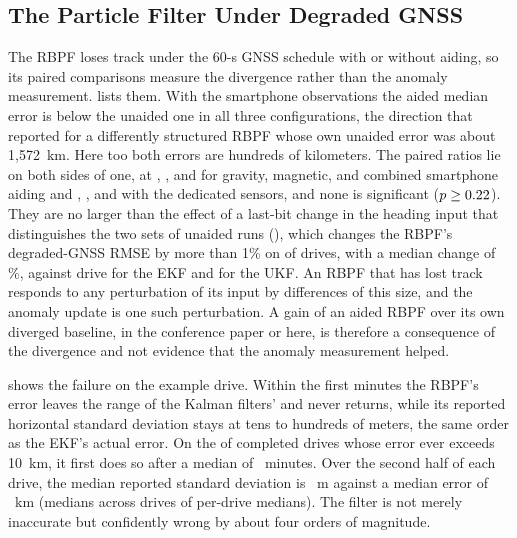 \subsection{The Particle Filter Under Degraded GNSS}
\label{sec:results-rbpf}

The RBPF loses track under the 60-s GNSS schedule with or without aiding, so its paired comparisons measure the divergence rather than the anomaly measurement.  lists them. With the smartphone observations the aided median error is below the unaided one in all three configurations, the direction that \citet{anom-pf} reported for a differently structured RBPF whose own unaided error was about 1{,}572~km. Here too both errors are hundreds of kilometers. The paired ratios lie on both sides of one, at \numphonerbpfgravratio, \numphonerbpfmagratio, and \numphonerbpfbothratio{} for gravity, magnetic, and combined smartphone aiding and \numdedicatedrbpfgravratio, \numdedicatedrbpfmagratio, and \numdedicatedrbpfbothratio{} with the dedicated sensors, and none is significant (\(p \geq 0.22\)). They are no larger than the effect of a last-bit change in the heading input that distinguishes the two sets of unaided runs (), which changes the RBPF's degraded-GNSS RMSE by more than 1\% on \numsensrbpfcount{} of \numsensrbpfn{} drives, with a median change of \numsensrbpfmedianpct\%, against \numsensekfcount{} drive for the EKF and \numsensukfcount{} for the UKF. An RBPF that has lost track responds to any perturbation of its input by differences of this size, and the anomaly update is one such perturbation. A gain of an aided RBPF over its own diverged baseline, in the conference paper or here, is therefore a consequence of the divergence and not evidence that the anomaly measurement helped.

 shows the failure on the example drive. Within the first minutes the RBPF's error leaves the range of the Kalman filters' and never returns, while its reported horizontal standard deviation stays at tens to hundreds of meters, the same order as the EKF's actual error. On the \rbpfdiagcrossed{} of \rbpfdiagdrives{} completed drives whose error ever exceeds 10~km, it first does so after a median of \rbpfdiagcrossingmin~minutes. Over the second half of each drive, the median reported standard deviation is \rbpfdiagsigmam~m against a median error of \rbpfdiagerrorkm~km (medians across drives of per-drive medians). The filter is not merely inaccurate but confidently wrong by about four orders of magnitude.

